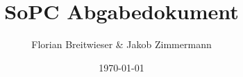 \documentclass[parskip=half,11pt,a4paper]{scrartcl}
\title{SoPC Abgabedokument}
\author{Florian Breitwieser \& Jakob Zimmermann}
\date{\today}
\begin{document}
\maketitle

\begin{sloppypar}

\tableofcontents          %
\listoffigures            %
\newpage



















\end{sloppypar}
\end{document}
